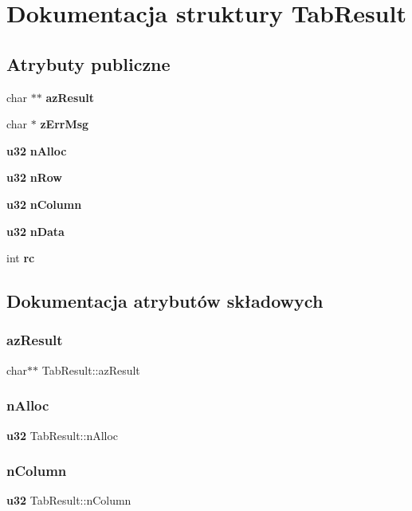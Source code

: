 \section{Dokumentacja struktury Tab\+Result}
\label{struct_tab_result}
\subsection*{Atrybuty publiczne}
\begin{DoxyCompactItemize}
\item 
char $\ast$$\ast$ \textbf{ az\+Result}
\item 
char $\ast$ \textbf{ z\+Err\+Msg}
\item 
\textbf{ u32} \textbf{ n\+Alloc}
\item 
\textbf{ u32} \textbf{ n\+Row}
\item 
\textbf{ u32} \textbf{ n\+Column}
\item 
\textbf{ u32} \textbf{ n\+Data}
\item 
int \textbf{ rc}
\end{DoxyCompactItemize}


\subsection{Dokumentacja atrybutów składowych}
\mbox{\label{struct_tab_result_a7446a22a7b39c17e447c65ba200490a6}} 
\subsubsection{azResult}
{\footnotesize\ttfamily char$\ast$$\ast$ Tab\+Result\+::az\+Result}

\mbox{\label{struct_tab_result_a9d07a6698e6b0293cf26fa3d39d222ea}} 
\subsubsection{nAlloc}
{\footnotesize\ttfamily \textbf{ u32} Tab\+Result\+::n\+Alloc}

\mbox{\label{struct_tab_result_a34f54427ffc26de952a3df8fd50a3cca}} 
\subsubsection{nColumn}
{\footnotesize\ttfamily \textbf{ u32} Tab\+Result\+::n\+Column}

